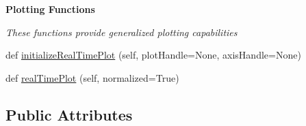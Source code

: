 \begin{Indent}{\bf Plotting Functions}\par
{\em These functions provide generalized plotting capabilities }\begin{DoxyCompactItemize}
\item 
def \hyperlink{classmodest_1_1substates_1_1substate_1_1SubState_a1adac64be88eab0a64bb952518c4268f}{initialize\+Real\+Time\+Plot} (self, plot\+Handle=None, axis\+Handle=None)
\item 
def \hyperlink{classmodest_1_1substates_1_1substate_1_1SubState_a2deb7d1ca3105eb20e50fa7e67298355}{real\+Time\+Plot} (self, normalized=True)
\end{DoxyCompactItemize}
\end{Indent}
\subsection*{Public Attributes}
